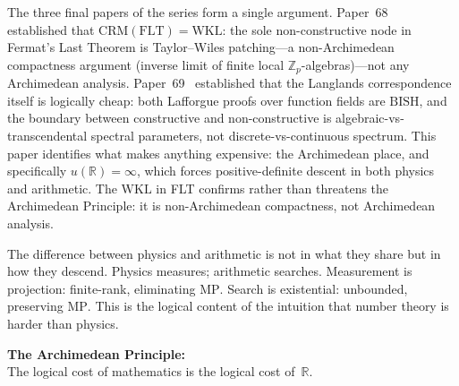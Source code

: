 \documentclass[11pt]{article}
\theoremstyle{definition}
\theoremstyle{remark}
\newcommand{\Z}{\mathbb{Z}}
\newcommand{\R}{\mathbb{R}}
\newcommand{\BISH}{\mathrm{BISH}}
\newcommand{\WKL}{\mathrm{WKL}}
\newcommand{\MP}{\mathrm{MP}}
\newcommand{\CRM}{\mathrm{CRM}}
\begin{document}
The three final papers of the series form a single argument. Paper~68~\cite{Paper68} established that $\CRM(\mathrm{FLT}) = \WKL$: the sole non-constructive node in Fermat's Last Theorem is Taylor--Wiles patching---a non-Archimedean compactness argument (inverse limit of finite local $\Z_p$-algebras)---not any Archimedean analysis. Paper~69~\cite{Paper69} established that the Langlands correspondence itself is logically cheap: both Lafforgue proofs over function fields are $\BISH$, and the boundary between constructive and non-constructive is algebraic-vs-transcendental spectral parameters, not discrete-vs-continuous spectrum. This paper identifies what makes anything expensive: the Archimedean place, and specifically $u(\R) = \infty$, which forces positive-definite descent in both physics and arithmetic. The $\WKL$ in FLT confirms rather than threatens the Archimedean Principle: it is non-Archimedean compactness, not Archimedean analysis.

The difference between physics and arithmetic is not in what they share but in how they descend. Physics measures; arithmetic searches. Measurement is projection: finite-rank, eliminating $\MP$. Search is existential: unbounded, preserving $\MP$. This is the logical content of the intuition that number theory is harder than physics.

\begin{mdframed}[linecolor=black,linewidth=1.5pt]
\begin{center}
\textbf{The Archimedean Principle:}\\[4pt]
The logical cost of mathematics is the logical cost of~$\R$.
\end{center}
\end{mdframed}
\end{document}
